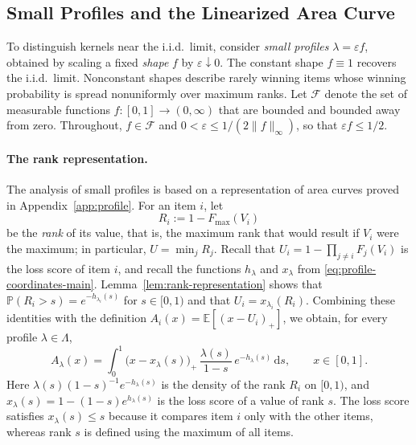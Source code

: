 \documentclass[11pt]{article}
\theoremstyle{definition}
\theoremstyle{remark}
\newcommand{\Pp}{\mathbb P}
\newcommand{\E}{\mathbb E}
\newcommand{\dd}{\,\mathrm d}
\begin{document}
\subsection{Small Profiles and the Linearized Area Curve}\label{sec:small-profiles}

To distinguish kernels near the i.i.d.\ limit, consider
\emph{small profiles} $\lambda=\varepsilon f$, obtained by scaling a
fixed \emph{shape} $f$ by $\varepsilon\downarrow0$.
The constant shape $f\equiv1$ recovers the i.i.d.\ limit.
Nonconstant shapes describe rarely winning items whose winning
probability is spread nonuniformly over maximum ranks.
Let $\mathcal F$ denote the set of measurable functions $f:[0,1]\to(0,\infty)$ that are bounded and bounded away from zero.
Throughout, $f\in\mathcal F$ and $0<\varepsilon\le1/(2\|f\|_\infty)$, so that $\varepsilon f\le1/2$.

\paragraph{The rank representation.}
The analysis of small profiles is based on a representation of area curves proved in Appendix~\ref{app:profile}.
For an item $i$, let
\[
 R_i:=1-F_{\max}(V_i)
\]
be the \emph{rank} of its value, that is, the maximum rank that would result if $V_i$ were the maximum; in particular, $U=\min_jR_j$.
Recall that $U_i=1-\prod_{j\ne i}F_j(V_i)$ is the loss score of item $i$, and recall the functions $h_\lambda$ and $x_\lambda$ from
\eqref{eq:profile-coordinates-main}.
Lemma~\ref{lem:rank-representation} shows that $\Pp(R_i>s)=e^{-h_{\lambda_i}(s)}$ for $s\in[0,1)$ and that $U_i=x_{\lambda_i}(R_i)$.
Combining these identities with the definition
$A_i(x)=\E[(x-U_i)_+]$, we obtain, for every profile
$\lambda\in\Lambda$,
\begin{equation}\label{eq:rank-area-main}
 A_\lambda(x)
 =\int_0^1\bigl(x-x_\lambda(s)\bigr)_+\,\frac{\lambda(s)}{1-s}\,e^{-h_\lambda(s)}\dd s,
 \qquad x\in[0,1].
\end{equation}
Here $\lambda(s)(1-s)^{-1}e^{-h_\lambda(s)}$ is the density of the rank $R_i$ on $[0,1)$, and $x_\lambda(s)=1-(1-s)e^{h_\lambda(s)}$ is the loss score of a value of rank $s$.
The loss score satisfies $x_\lambda(s)\le s$ because it compares
item $i$ only with the other items, whereas rank $s$ is defined
using the maximum of all items.
\end{document}
